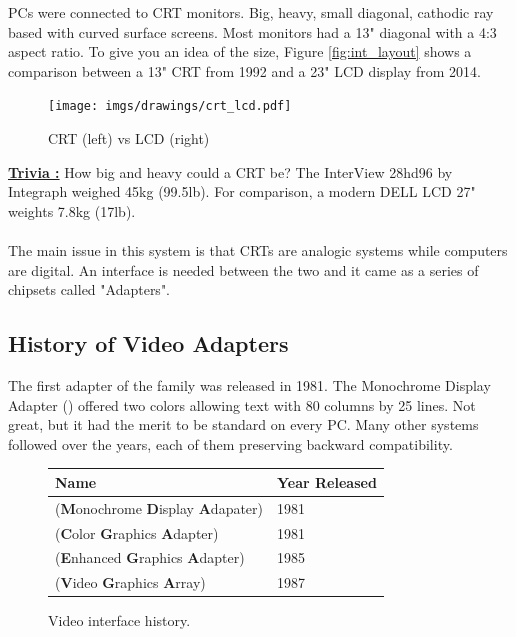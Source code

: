 \documentclass[book.tex]{subfiles}
\begin{document}
PCs were connected to CRT monitors. Big, heavy, small diagonal, cathodic ray based with curved surface screens. Most monitors had a 13" diagonal with a 4:3 aspect ratio. To give you an idea of the size, Figure \ref{fig:int_layout} shows a comparison between a 13" CRT from 1992 and a 23" LCD display from 2014.\\

\begin{figure}[H]
\centering
\texttt{[image: imgs/drawings/crt\_lcd.pdf]}
\caption{CRT (left) vs LCD (right)}
\label{fig:lcd_vs_crt}
\end{figure}

\textbf{\underline{Trivia :}} How big and heavy could a CRT be? The InterView 28hd96 by Integraph weighed 45kg (99.5lb). For comparison, a modern DELL LCD 27" weights 7.8kg (17lb).\\
\\
The main issue in this system is that CRTs are analogic systems while computers are digital. An interface is needed between the two and it came as a series of chipsets called "Adapters". 

  \subsection{History of Video Adapters}

The first adapter of the family was released in 1981. The Monochrome Display
   Adapter () offered two colors allowing text with 80 columns by 25 lines.  Not great, but it had the merit to be standard on every PC. Many other systems followed over the years, each of them preserving backward compatibility.
\bigskip
  
 \begin{figure}[H]
\centering  
\begin{tabularx}{\textwidth}{ X  Y }
  \toprule
  \textbf{Name} &  \textbf{Year Released} \\
  \toprule {}
   (\textbf{M}onochrome
   \textbf{D}isplay
   \textbf{A}dapater) & 1981 
   \\ 
   (\textbf{C}olor
   \textbf{G}raphics
   \textbf{A}dapter) & 1981 
    \\ 
   (\textbf{E}nhanced
   \textbf{G}raphics
   \textbf{A}dapter) & 1985
   \\ 
   (\textbf{V}ideo
   \textbf{G}raphics
   \textbf{A}rray)  & 1987
    \\
  \toprule
\end{tabularx}
\caption{Video interface history.}\label{fig:vga_history}
\end{figure}
\end{document}

